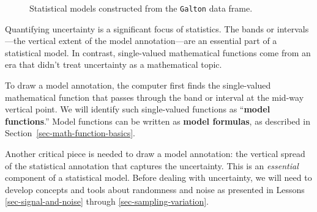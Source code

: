 \documentclass[
  letterpaper,
  DIV=11,
  numbers=noendperiod,
  oneside]{scrartcl}
\begin{document}
\begin{figure}
{{}




}

\caption{\label{fig-some-model-annotations}Statistical models
constructed from the \texttt{Galton} data frame.}

\end{figure}%

Quantifying uncertainty is a significant focus of statistics. The bands
or intervals---the vertical extent of the model annotation---are an
essential part of a statistical model. In contrast, single-valued
mathematical functions come from an era that didn't treat uncertainty as
a mathematical topic.

To draw a model annotation, the computer first finds the single-valued
mathematical function that passes through the band or interval at the
mid-way vertical point. We will identify such single-valued functions as
``\textbf{model functions}.'' Model functions can be written as
\textbf{model formulas}, as described in
Section~\ref{sec-math-function-basics}.

Another critical piece is needed to draw a model annotation: the
vertical spread of the statistical annotation that captures the
uncertainty. This is an \emph{essential} component of a statistical
model. Before dealing with uncertainty, we will need to develop concepts
and tools about randomness and noise as presented in Lessons
\ref{sec-signal-and-noise} through \ref{sec-sampling-variation}.
\end{document}
